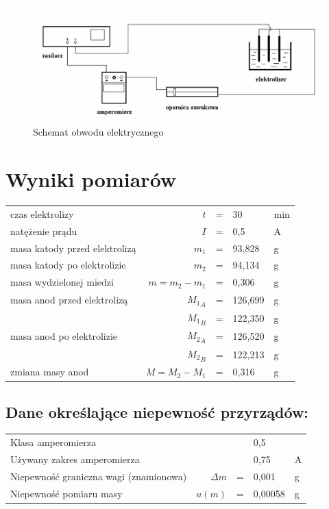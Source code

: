 \documentclass[a4paper,11pt]{article}
\begin{document}
\begin{figure}[h!]
\centering
\includegraphics[width=0.7\linewidth]{./uklad}
\caption{Schemat obwodu elektrycznego}
\label{fig:uklad}
\end{figure}


\section{Wyniki pomiarów}
\begin{center}
\begin{tabular}{lrlll}
czas elektrolizy               & $t$ & = & 30 & min  \\ 
natężenie prądu               &  $I$ & = & 0,5 & A \\ 
masa katody przed elektrolizą &  $m_1$ & = & 93,828 & g \\ 
masa katody po elektrolizie  &   $m_2$ & = & 94,134 & g\\ 
masa wydzielonej miedzi       &  $m = m_2 - m_1$& = & 0,306 & g \\ 
masa anod przed elektrolizą   &   ${M_1}_{A}$ & = &126,699 & g\\ 
  &   ${M_1}_{B}$ & = &122,350 & g\\ 
masa anod po elektrolizie     &   ${M_2}_{A}$ & = &126,520 & g\\
  &   ${M_2}_{B}$ & = &122,213 & g\\  
zmiana masy anod               &  $M = M_2 - M_1$& = & 0,316 & g \\  
\end{tabular} 
\end{center}

\subsection*{Dane określające niepewność przyrządów:}
\begin{center}
\begin{tabular}{lrlll}
Klasa amperomierza              & &  & 0,5 &   \\ 
Używany zakres amperomierza               &   &  & 0,75 & A \\ 
Niepewność graniczna wagi (znamionowa)&  $\Delta m$ & = & 0,001 & g \\ 
Niepewność pomiaru masy &   $u(m)$& = & 0,00058 & g\\  
\end{tabular} 
\end{center}
\end{document}
